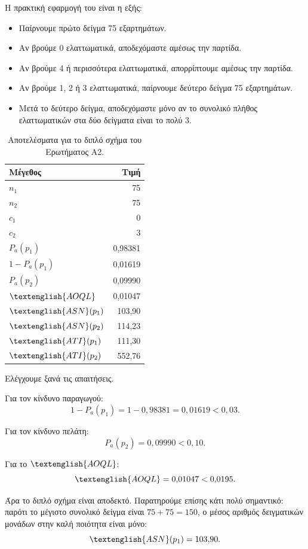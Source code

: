 \documentclass[12pt,a4paper]{article}
\newcommand{\Pa}{P_{\!a}}
\newcommand{\AOQL}{\textenglish{AOQL}}
\newcommand{\ATI}{\textenglish{ATI}}
\newcommand{\ASN}{\textenglish{ASN}}
\begin{document}
Η πρακτική εφαρμογή του είναι η εξής:

\begin{itemize}
    \item Παίρνουμε πρώτο δείγμα 75 εξαρτημάτων.
    \item Αν βρούμε 0 ελαττωματικά, αποδεχόμαστε αμέσως την παρτίδα.
    \item Αν βρούμε 4 ή περισσότερα ελαττωματικά, απορρίπτουμε αμέσως την
    παρτίδα.
    \item Αν βρούμε 1, 2 ή 3 ελαττωματικά, παίρνουμε δεύτερο δείγμα 75
    εξαρτημάτων.
    \item Μετά το δεύτερο δείγμα, αποδεχόμαστε μόνο αν το συνολικό πλήθος
    ελαττωματικών στα δύο δείγματα είναι το πολύ 3.
\end{itemize}

\begin{table}[H]
\centering
\caption{Αποτελέσματα για το διπλό σχήμα του Ερωτήματος Α2.}
\begin{tabular}{lr}
\toprule
\textbf{Μέγεθος} & \textbf{Τιμή} \\
\midrule
\(n_1\) & 75 \\
\(n_2\) & 75 \\
\(c_1\) & 0 \\
\(c_2\) & 3 \\
\(\Pa(p_1)\) & 0,98381 \\
\(1-\Pa(p_1)\) & 0,01619 \\
\(\Pa(p_2)\) & 0,09990 \\
\(\AOQL\) & 0,01047 \\
\(\ASN(p_1)\) & 103,90 \\
\(\ASN(p_2)\) & 114,23 \\
\(\ATI(p_1)\) & 111,30 \\
\(\ATI(p_2)\) & 552,76 \\
\bottomrule
\end{tabular}
\end{table}

Ελέγχουμε ξανά τις απαιτήσεις.

Για τον κίνδυνο παραγωγού:
\[
    1-\Pa(p_1)=1-0{,}98381=0{,}01619<0{,}03.
\]

Για τον κίνδυνο πελάτη:
\[
    \Pa(p_2)=0{,}09990<0{,}10.
\]

Για το \(\AOQL\):
\[
    \AOQL=0{,}01047<0{,}0195.
\]

Άρα το διπλό σχήμα είναι αποδεκτό. Παρατηρούμε επίσης κάτι πολύ σημαντικό:
παρότι το μέγιστο συνολικό δείγμα είναι \(75+75=150\), ο μέσος αριθμός
δειγματικών μονάδων στην καλή ποιότητα είναι μόνο:
\[
    \ASN(p_1)=103{,}90.
\]
\end{document}

